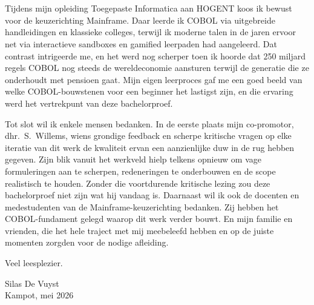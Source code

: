 
\chapter*{}%
\label{ch:voorwoord}

Tijdens mijn opleiding Toegepaste Informatica aan HOGENT koos ik bewust voor de keuzerichting Mainframe. Daar leerde ik COBOL via uitgebreide handleidingen en klassieke colleges, terwijl ik moderne talen in de jaren ervoor net via interactieve sandboxes en gamified leerpaden had aangeleerd. Dat contrast intrigeerde me, en het werd nog scherper toen ik hoorde dat 250 miljard regels COBOL nog steeds de wereldeconomie aansturen terwijl de generatie die ze onderhoudt met pensioen gaat. Mijn eigen leerproces gaf me een goed beeld van welke COBOL-bouwstenen voor een beginner het lastigst zijn, en die ervaring werd het vertrekpunt van deze bachelorproef.

Tot slot wil ik enkele mensen bedanken. In de eerste plaats mijn co-promotor, dhr.\ S.\ Willems, wiens grondige feedback en scherpe kritische vragen op elke iteratie van dit werk de kwaliteit ervan een aanzienlijke duw in de rug hebben gegeven. Zijn blik vanuit het werkveld hielp telkens opnieuw om vage formuleringen aan te scherpen, redeneringen te onderbouwen en de scope realistisch te houden. Zonder die voortdurende kritische lezing zou deze bachelorproef niet zijn wat hij vandaag is. Daarnaast wil ik ook de docenten en medestudenten van de Mainframe-keuzerichting bedanken. Zij hebben het COBOL-fundament gelegd waarop dit werk verder bouwt. En mijn familie en vrienden, die het hele traject met mij meebeleefd hebben en op de juiste momenten zorgden voor de nodige afleiding.

\bigskip
\noindent
Veel leesplezier.

\bigskip
\noindent
Silas De Vuyst \\
Kampot, mei 2026
